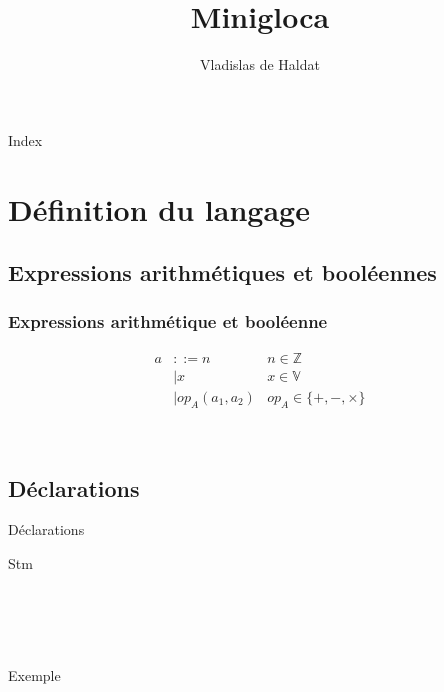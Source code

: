 \documentclass{beamer}
\title{Minigloca}
\author{Vladislas de Haldat}
\begin{document}

\begin{frame}
	\titlepage
\end{frame}

\begin{frame}{Index}
	\tableofcontents
\end{frame}

\section{Définition du langage}
\subsection{Expressions arithmétiques et booléennes}
\begin{frame}
	\frametitle{Expressions arithmétique et booléenne}
	\begin{align*}
  		a & ::= n & n \in \mathbb{Z}\\
		&\mid x & x \in \mathbb{V}\\
		&\mid op_A(a_1, a_2) & op_A \in \{+, -, \times\}
	\end{align*}
	\begin{dtype}{\boolexp}
		\\
	  \end{dtype}
\end{frame}

\subsection{Déclarations}
\begin{frame}{Déclarations}
	\begin{dtype}{Stm}
		\\
		\\
		\akind{\sskip}\\
		\\
		\\
	  \end{dtype}
\end{frame}

\begin{frame}{Exemple}
	\lst
\end{frame}
\end{document}
